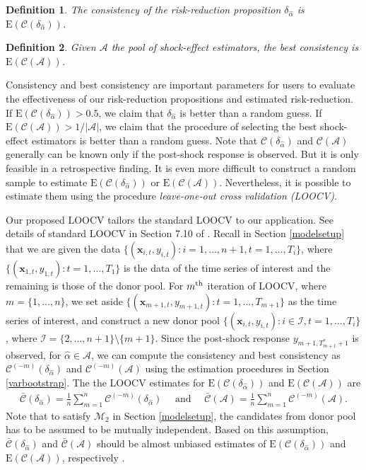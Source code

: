 \documentclass[11pt]{article}
\def\mbf#1{\mathbf{#1}} %
\def\mc#1{\mathcal{#1}} %
\def\E#1{\mathrm{E}(#1)} %
\newtheorem{defn}{Definition}
\theoremstyle{definition}
\begin{document}
\begin{defn}
\normalfont 	\label{consistency}The \emph{consistency} of 	the risk-reduction proposition $\delta_{\hat{\alpha}}$ is $\E{\mc{C}(\delta_{\hat{\alpha}})}$.
\end{defn}

\begin{defn}
	\normalfont  \label{best consistency}Given $\mc{A}$ the pool of shock-effect estimators, the \emph{best consistency} is $\E{\mc{C}(\mc{A})}$.
\end{defn}
Consistency and best consistency are important parameters for users to evaluate the effectiveness of our risk-reduction propositions and estimated risk-reduction. If $\E{\mc{C}(\delta_{\hat{\alpha}})} > 0.5$, we  claim that $\delta_{\hat{\alpha}}$ is better than a random guess. If $\E{\mc{C}(\mc{A})} > 1/ |\mc{A}|$, we claim that the procedure of selecting the best shock-effect estimators is better than a random guess. Note that $\mc{C}(\delta_{\hat{\alpha}})$
 and $\mc{C}(\mc{A})$ generally can be known only if the post-shock response is observed. But it is only feasible in a retrospective finding. It is even more difficult to construct a random sample to estimate $\E{\mc{C}(\delta_{\hat{\alpha}})}$ or $\E{\mc{C}(\mc{A})}$. Nevertheless, it is possible to estimate them using the procedure \emph{leave-one-out cross validation (LOOCV)}.

Our proposed LOOCV tailors the standard LOOCV to our application. See details of standard LOOCV in Section 7.10 of \citet{hastie2009elements}.  Recall in Section \ref{modelsetup} that we are given the data $\{(\mbf{x}_{i,t}, y_{i,t}) \colon i = 1, \ldots, n+1, t = 1, \ldots, T_i\}$, where $\{(\mbf{x}_{1,t}, y_{1,t})\colon t = 1, \ldots, T_1\}$ is the data of the time series of interest and the remaining is those of the donor pool. For $m^{\rm th}$ iteration of LOOCV, where $m = \{1, \ldots, n\}$, we set aside $\{(\mbf{x}_{m + 1, t}, y_{m + 1, t}) \colon t = 1, \ldots, T_{m+1}\}$ as the time series of interest, and construct a new donor pool $\{(\mbf{x}_{i, t}, y_{i, t}) \colon i \in \mc{I}, t = 1, \ldots, T_{i}\}$, where $\mc{I}=\{2, \ldots, n+1\} \setminus \{m+1\}$. Since the post-shock response $y_{m+1, T_{m+1}^*+1}$ is observed, for $\hat{\alpha}\in \mc{A}$, we can compute the consistency and best consistency as $\mc{C} ^{(-m)}(\delta_{\hat{\alpha}})$ and $\mc{C} ^{(-m)}(\mc{A})$  using the estimation procedures in Section \ref{varbootstrap}. The the LOOCV estimates for $\E{\mc{C}(\delta_{\hat{\alpha}})}$  and $\E{\mc{C}(\mc{A})}$ are
\begin{align*}
	 \bar{\mc{C}}(\delta_{\hat{\alpha}})= \frac{1}{n} \sum_{m = 1}^n \mc{C} ^{(-m)}(\delta_{\hat{\alpha}})
	 \quad \text{ and } \quad \bar{\mc{C}}(\mc{A})= \frac{1}{n} \sum_{m = 1}^n \mc{C} ^{(-m)}(\mc{A}).
\end{align*}
Note that to satisfy $\mc{M}_{2}$ in Section \ref{modelsetup}, the candidates from donor pool has to be assumed to be mutually independent. Based on this assumption, $\bar{\mc{C}}(\delta_{\hat{\alpha}})$ and $\bar{\mc{C}}(\mc{A})$ should be almost unbiased estimates of $\E{\mc{C}(\delta_{\hat{\alpha}})}$ and $\E{\mc{C}(\mc{A})}$, respectively \citep[Page 222]{msos}.
\end{document}

